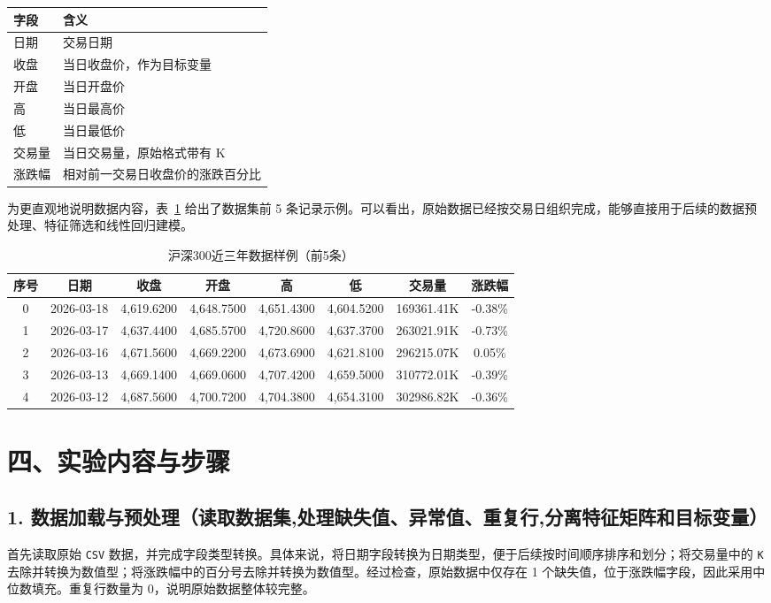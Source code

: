 \documentclass[12pt,a4paper]{ctexart}
\begin{document}
\begin{table}[H]
\centering
\begin{tabular}{>{\raggedright\arraybackslash}p{3cm} >{\raggedright\arraybackslash}p{9.5cm}}
\toprule
字段 & 含义 \\
\midrule
日期 & 交易日期 \\
收盘 & 当日收盘价，作为目标变量 \\
开盘 & 当日开盘价 \\
高 & 当日最高价 \\
低 & 当日最低价 \\
交易量 & 当日交易量，原始格式带有 K \\
涨跌幅 & 相对前一交易日收盘价的涨跌百分比 \\
\bottomrule
\end{tabular}
\end{table}

为更直观地说明数据内容，表~\ref{tab:data-sample} 给出了数据集前 5 条记录示例。可以看出，原始数据已经按交易日组织完成，能够直接用于后续的数据预处理、特征筛选和线性回归建模。

\begin{table}[H]
\centering
\caption{沪深300近三年数据样例（前5条）}
\label{tab:data-sample}
\small
\begin{tabular}{c c c c c c c c}
\toprule
序号 & 日期 & 收盘 & 开盘 & 高 & 低 & 交易量 & 涨跌幅 \\
\midrule
0 & 2026-03-18 & 4,619.6200 & 4,648.7500 & 4,651.4300 & 4,604.5200 & 169361.41K & -0.38\% \\
1 & 2026-03-17 & 4,637.4400 & 4,685.5700 & 4,720.8600 & 4,637.3700 & 263021.91K & -0.73\% \\
2 & 2026-03-16 & 4,671.5600 & 4,669.2200 & 4,673.6900 & 4,621.8100 & 296215.07K & 0.05\% \\
3 & 2026-03-13 & 4,669.1400 & 4,669.0600 & 4,707.4200 & 4,659.5000 & 310772.01K & -0.39\% \\
4 & 2026-03-12 & 4,687.5600 & 4,700.7200 & 4,704.3800 & 4,654.3100 & 302986.82K & -0.36\% \\
\bottomrule
\end{tabular}
\end{table}

\section*{四、实验内容与步骤}

\subsection*{1. 数据加载与预处理（读取数据集,处理缺失值、异常值、重复行,分离特征矩阵和目标变量）}
首先读取原始 \texttt{CSV} 数据，并完成字段类型转换。具体来说，将日期字段转换为日期类型，便于后续按时间顺序排序和划分；将交易量中的 \texttt{K} 去除并转换为数值型；将涨跌幅中的百分号去除并转换为数值型。经过检查，原始数据中仅存在 1 个缺失值，位于涨跌幅字段，因此采用中位数填充。重复行数量为 0，说明原始数据整体较完整。
\end{document}
